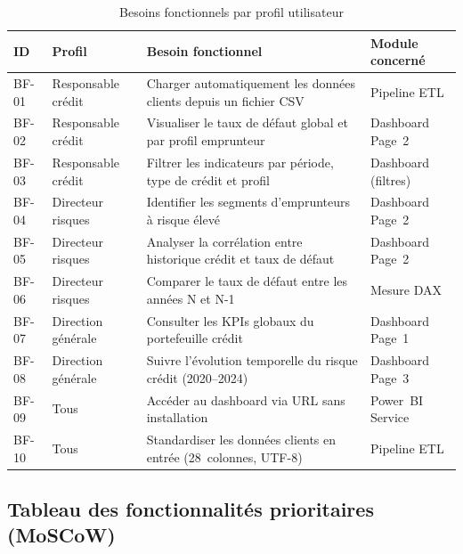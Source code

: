 \documentclass[12pt, a4paper]{report}
\begin{document}
\begin{table}[H]
\centering
\caption{Besoins fonctionnels par profil utilisateur}
\label{tab:bf_profils}
\renewcommand{\arraystretch}{1.4}
\begin{tabularx}{\textwidth}{p{1cm} p{2.5cm} X p{2.5cm}}
\toprule
\rowcolor{primary!12}
ID & Profil & Besoin fonctionnel & Module concerné \\
\midrule
BF-01 & Responsable crédit & Charger automatiquement les données clients depuis un fichier CSV & Pipeline ETL \\
BF-02 & Responsable crédit & Visualiser le taux de défaut global et par profil emprunteur & Dashboard Page~2 \\
BF-03 & Responsable crédit & Filtrer les indicateurs par période, type de crédit et profil & Dashboard (filtres) \\
BF-04 & Directeur risques & Identifier les segments d'emprunteurs à risque élevé & Dashboard Page~2 \\
BF-05 & Directeur risques & Analyser la corrélation entre historique crédit et taux de défaut & Dashboard Page~2 \\
BF-06 & Directeur risques & Comparer le taux de défaut entre les années N et N-1 & Mesure DAX \\
BF-07 & Direction \newline générale & Consulter les KPIs globaux du portefeuille crédit & Dashboard Page~1 \\
BF-08 & Direction  \newline générale & Suivre l'évolution temporelle du risque crédit (2020--2024) & Dashboard Page~3 \\
BF-09 & Tous & Accéder au dashboard via URL sans installation & Power~BI Service \\
BF-10 & Tous & Standardiser les données clients en entrée (28~colonnes, UTF-8) & Pipeline ETL \\
\bottomrule
\end{tabularx}
\end{table}

\subsection{Tableau des fonctionnalités prioritaires (MoSCoW)}
\end{document}
